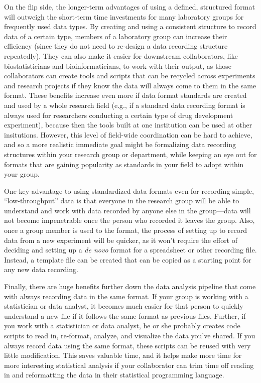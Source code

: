\documentclass[]{tufte-book}
\begin{document}
On the flip side, the longer-term advantages of using a defined, structured
format will outweigh the short-term time investments for many laboratory groups
for frequently used data types. By creating and using a consistent structure to
record data of a certain type, members of a laboratory group can increase their
efficiency (since they do not need to re-design a data recording structure
repeatedly). They can also make it easier for downstream collaborators, like
biostatisticians and bioinformaticians, to work with their output, as those
collaborators can create tools and scripts that can be recycled across
experiments and research projects if they know the data will always come to them
in the same format. These benefits increase even more if data format standards
are created and used by a whole research field (e.g., if a standard data
recording format is always used for researchers conducting a certain type of
drug development experiment), because then the tools built at one institution
can be used at other insitutions. However, this level of field-wide coordination
can be hard to achieve, and so a more realistic immediate goal might be
formalizing data recording structures within your research group or department,
while keeping an eye out for formats that are gaining popularity as standards in
your field to adopt within your group.

One key advantage to using standardized data formats even for recording simple,
``low-throughput'' data is that everyone in the research group will be able to
understand and work with data recorded by anyone else in the group---data will
not become impenetrable once the person who recorded it leaves the group. Also,
once a group member is used to the format, the process of setting up to record
data from a new experiment will be quicker, as it won't require the effort of
deciding and setting up a \emph{de novo} format for a spreadsheet or other recording
file. Instead, a template file can be created that can be copied as a starting
point for any new data recording.

Finally, there are huge benefits further down the data analysis pipeline that
come with always recording data in the same format. If your group is working
with a statistician or data analyst, it becomes much easier for that person to
quickly understand a new file if it follows the same format as previous files.
Further, if you work with a statistician or data analyst, he or she probably
creates code scripts to read in, re-format, analyze, and visualize the data
you've shared. If you always record data using the same format, these scripts
can be reused with very little modification. This saves valuable time, and it
helps make more time for more interesting statistical analysis if your
collaborator can trim time off reading in and reformatting the data in their
statistical programming language.
\end{document}
